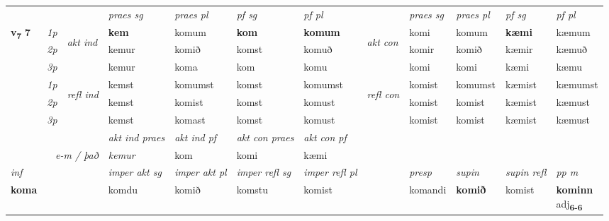 \begin{longtable}[l]{X>{\footnotesize\itshape}llXXXXlXXXX}
 & &   & \textit{praes sg}  & \textit{praes pl}    & \textit{ pf sg} & \textit{pf pl} & & \textit{praes sg}  & \textit{praes pl}    & \textit{pf sg} & \textit{pf pl }  \\ \cmidrule{4-7} \cmidrule{9-12}
 \multirow{2}{*}{{{\textbf{v{\textsubscript{7}}} \Large{\textbf{7}}}}}  & 1p & \multirow{3}{*}{\begin{turn}{90}\textit{akt ind}\end{turn}} & \textbf{kem} & komum & \textbf{kom} & \textbf{komum} & \multirow{3}{*}{\begin{turn}{90}\textit{akt con}\end{turn}} &komi & komum & \textbf{kæmi} & kæmum\\*
 & 2p &  &  kemur  & komið & komst & komuð & & komir & komið & kæmir & kæmuð \\*
 & 3p &  & kemur & koma & kom & komu & & komi & komi& kæmi & kæmu \\*
\cmidrule{4-7} \cmidrule{9-12}
 & 1p & \multirow{3}{*}{\begin{turn}{90}\textit{refl ind}\end{turn}}  & kemst & komumst & komst & komumst & \multirow{3}{*}{\begin{turn}{90}\textit{refl con}\end{turn}}  &komist & komumst & kæmist & kæmumst \\*
 & 2p &  & kemst & komist & komst & komust & &komist & komist & kæmist & kæmust \\*
 & 3p  & & kemst & komast & komst & komust & & komist & komist& kæmist & kæmust \\*
\cmidrule{4-7} \cmidrule{9-12}

   && &  \textit{akt ind praes} & \textit{akt ind pf} & \textit{akt con praes} & \textit{akt con pf} \\*
\multicolumn{3}{r}{\textit{e-m / það}} & kemur & kom & komi & kæmi \\*

\cmidrule{4-7}
   {\textit{inf}} & &  & \textit{imper akt sg} & \textit{imper akt pl} & \textit{imper refl sg} & \textit{imper refl pl} && \textit{presp} & \textit{supin} & \textit{supin refl} & \textit{pp m} \\*
  {\textbf{koma}} & && komdu  & komið & komstu & komist && komandi &  \textbf{komið} & komist & \specialcell{\textbf{kominn} \\ adj\textbf{\textsubscript{6-6}}} \\*

\midrule


\end{longtable}
